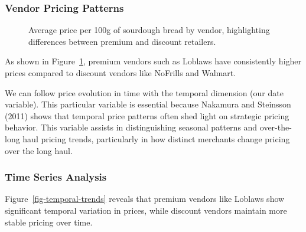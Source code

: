 \documentclass[
  letterpaper,
  DIV=11,
  numbers=noendperiod]{scrartcl}
\begin{document}
\subsubsection{Vendor Pricing Patterns}\label{vendor-pricing-patterns}

\begin{figure}


\caption{\label{fig-vendor-prices}Average price per 100g of sourdough
bread by vendor, highlighting differences between premium and discount
retailers.}

\end{figure}%

As shown in Figure~\ref{fig-vendor-prices}, premium vendors such as
Loblaws have consistently higher prices compared to discount vendors
like NoFrills and Walmart.

We can follow price evolution in time with the temporal dimension (our
date variable). This particular variable is essential because Nakamura
and Steinsson (2011) shows that temporal price patterns often shed light
on strategic pricing behavior. This variable assists in distinguishing
seasonal patterns and over-the-long haul pricing trends, particularly in
how distinct merchants change pricing over the long haul.

\subsubsection{Time Series Analysis}\label{time-series-analysis}

Figure~\ref{fig-temporal-trends} reveals that premium vendors like
Loblaws show significant temporal variation in prices, while discount
vendors maintain more stable pricing over time.
\end{document}
